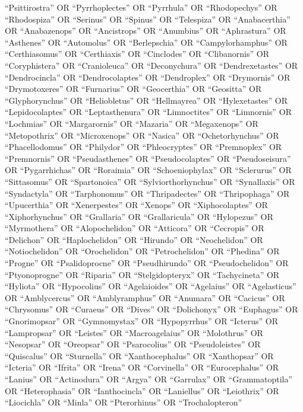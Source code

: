 \documentclass[
  number,
  review,
  onecolumn]{elsarticle}
\begin{document}
``Psittirostra'' OR ``Pyrrhoplectes'' OR ``Pyrrhula'' OR ``Rhodopechys''
OR ``Rhodospiza'' OR ``Serinus'' OR ``Spinus'' OR ``Telespiza'' OR
``Anabacerthia'' OR ``Anabazenops'' OR ``Ancistrops'' OR ``Anumbius'' OR
``Aphrastura'' OR ``Asthenes'' OR ``Automolus'' OR ``Berlepschia'' OR
``Campylorhamphus'' OR ``Certhiasomus'' OR ``Certhiaxis'' OR
``Cinclodes'' OR ``Clibanornis'' OR ``Coryphistera'' OR ``Cranioleuca''
OR ``Deconychura'' OR ``Dendrexetastes'' OR ``Dendrocincla'' OR
``Dendrocolaptes'' OR ``Dendroplex'' OR ``Drymornis'' OR
``Drymotoxeres'' OR ``Furnarius'' OR ``Geocerthia'' OR ``Geositta'' OR
``Glyphorynchus'' OR ``Heliobletus'' OR ``Hellmayrea'' OR
``Hylexetastes'' OR ``Lepidocolaptes'' OR ``Leptasthenura'' OR
``Limnoctites'' OR ``Limnornis'' OR ``Lochmias'' OR ``Margarornis'' OR
``Mazaria'' OR ``Megaxenops'' OR ``Metopothrix'' OR ``Microxenops'' OR
``Nasica'' OR ``Ochetorhynchus'' OR ``Phacellodomus'' OR ``Philydor'' OR
``Phleocryptes'' OR ``Premnoplex'' OR ``Premnornis'' OR
``Pseudasthenes'' OR ``Pseudocolaptes'' OR ``Pseudoseisura'' OR
``Pygarrhichas'' OR ``Roraimia'' OR ``Schoeniophylax'' OR ``Sclerurus''
OR ``Sittasomus'' OR ``Spartonoica'' OR ``Sylviorthorhynchus'' OR
``Synallaxis'' OR ``Syndactyla'' OR ``Tarphonomus'' OR ``Thripadectes''
OR ``Thripophaga'' OR ``Upucerthia'' OR ``Xenerpestes'' OR ``Xenops'' OR
``Xiphocolaptes'' OR ``Xiphorhynchus'' OR ``Grallaria'' OR
``Grallaricula'' OR ``Hylopezus'' OR ``Myrmothera'' OR ``Alopochelidon''
OR ``Atticora'' OR ``Cecropis'' OR ``Delichon'' OR ``Haplochelidon'' OR
``Hirundo'' OR ``Neochelidon'' OR ``Notiochelidon'' OR ``Orochelidon''
OR ``Petrochelidon'' OR ``Phedina'' OR ``Progne'' OR ``Psalidoprocne''
OR ``Pseudhirundo'' OR ``Pseudochelidon'' OR ``Ptyonoprogne'' OR
``Riparia'' OR ``Stelgidopteryx'' OR ``Tachycineta'' OR ``Hyliota'' OR
``Hypocolius'' OR ``Agelaioides'' OR ``Agelaius'' OR ``Agelasticus'' OR
``Amblycercus'' OR ``Amblyramphus'' OR ``Anumara'' OR ``Cacicus'' OR
``Chrysomus'' OR ``Curaeus'' OR ``Dives'' OR ``Dolichonyx'' OR
``Euphagus'' OR ``Gnorimopsar'' OR ``Gymnomystax'' OR ``Hypopyrrhus'' OR
``Icterus'' OR ``Lampropsar'' OR ``Leistes'' OR ``Macroagelaius'' OR
``Molothrus'' OR ``Nesopsar'' OR ``Oreopsar'' OR ``Psarocolius'' OR
``Pseudoleistes'' OR ``Quiscalus'' OR ``Sturnella'' OR
``Xanthocephalus'' OR ``Xanthopsar'' OR ``Icteria'' OR ``Ifrita'' OR
``Irena'' OR ``Corvinella'' OR ``Eurocephalus'' OR ``Lanius'' OR
``Actinodura'' OR ``Argya'' OR ``Garrulax'' OR ``Grammatoptila'' OR
``Heterophasia'' OR ``Ianthocincla'' OR ``Laniellus'' OR ``Leiothrix''
OR ``Liocichla'' OR ``Minla'' OR ``Pterorhinus'' OR ``Trochalopteron''
\end{document}
